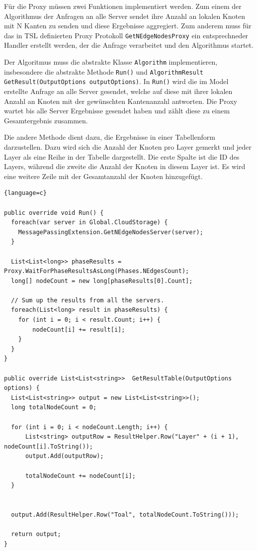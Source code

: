 Für die Proxy müssen zwei Funktionen implementiert werden. Zum einem der Algorithmus der Anfragen an alle Server sendet ihre Anzahl an lokalen Knoten mit N Kanten zu senden und diese Ergebnisse aggregiert. Zum anderem muss 
für das in TSL definierten Proxy Protokoll \verb|GetNEdgeNodesProxy| ein entsprechneder Handler erstellt werden, der die Anfrage verarbeitet und den Algorithmus startet.

Der Algoritmus muss die abstrakte Klasse \verb|Algorithm| implementieren, insbesondere die abstrakte Methode \verb|Run()| und \verb|AlgorithmResult GetResult(OutputOptions outputOptions)|. In \verb|Run()| wird die im Model erstellte Anfrage an alle Server gesendet, welche auf diese mit ihrer lokalen Anzahl an Knoten mit der gewünschten Kantenanzahl antworten. Die Proxy
wartet bis alle Server Ergebnisse gesendet haben und zählt diese zu einem Gesamtergebnis zusammen.

Die andere Methode dient dazu, die Ergebnisse in einer Tabellenform darzustellen. Dazu wird sich die Anzahl der Knoten pro Layer gemerkt und jeder Layer als eine Reihe in der Tabelle dargestellt. Die erste Spalte ist die ID des Layers, während die zweite die Anzahl der Knoten in diesem Layer ist. Es wird eine weitere Zeile mit der Gesamtanzahl der Knoten hinzugefügt.

\begin{lstlisting}{language=c}

public override void Run() {
  foreach(var server in Global.CloudStorage) {
    MessagePassingExtension.GetNEdgeNodesServer(server);
  }

  List<List<long>> phaseResults =  Proxy.WaitForPhaseResultsAsLong(Phases.NEdgesCount);
  long[] nodeCount = new long[phaseResults[0].Count];

  // Sum up the results from all the servers.
  foreach(List<long> result in phaseResults) {
    for (int i = 0; i < result.Count; i++) {
        nodeCount[i] += result[i];
    }
  }
}

public override List<List<string>>  GetResultTable(OutputOptions options) {
  List<List<string>> output = new List<List<string>>();
  long totalNodeCount = 0;

  for (int i = 0; i < nodeCount.Length; i++) {
      List<string> outputRow = ResultHelper.Row("Layer" + (i + 1), nodeCount[i].ToString()); 
      output.Add(outputRow);

      totalNodeCount += nodeCount[i];
  }


  output.Add(ResultHelper.Row("Toal", totalNodeCount.ToString()));

  return output;
}



\end{lstlisting}


